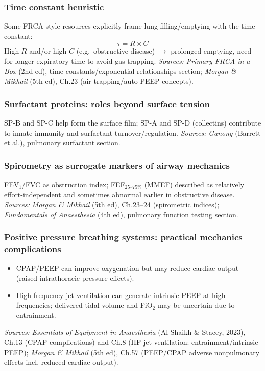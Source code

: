 \documentclass[11pt,a4paper]{article}
\begin{document}
\subsubsection{Time constant heuristic}
Some FRCA-style resources explicitly frame lung filling/emptying with the time constant:
\[
\tau = R \times C
\]
High $R$ and/or high $C$ (e.g.\ obstructive disease) $\rightarrow$ prolonged emptying, need for longer expiratory time to avoid gas trapping.
\textit{Sources:} \emph{Primary FRCA in a Box} (2nd ed), time constants/exponential relationships section; \emph{Morgan \& Mikhail} (5th ed), Ch.23 (air trapping/auto-PEEP concepts).

\subsubsection{Surfactant proteins: roles beyond surface tension}
SP-B and SP-C help form the surface film; SP-A and SP-D (collectins) contribute to innate immunity and surfactant turnover/regulation.
\textit{Sources:} \emph{Ganong} (Barrett et al.), pulmonary surfactant section.

\subsubsection{Spirometry as surrogate markers of airway mechanics}
FEV$_1$/FVC as obstruction index; FEF$_{25\text{--}75\%}$ (MMEF) described as relatively effort-independent and sometimes abnormal earlier in obstructive disease.
\textit{Sources:} \emph{Morgan \& Mikhail} (5th ed), Ch.23--24 (spirometric indices); \emph{Fundamentals of Anaesthesia} (4th ed), pulmonary function testing section.

\subsubsection{Positive pressure breathing systems: practical mechanics complications}
\begin{itemize}
  \item CPAP/PEEP can improve oxygenation but may reduce cardiac output (raised intrathoracic pressure effects).
  \item High-frequency jet ventilation can generate intrinsic PEEP at high frequencies; delivered tidal volume and FiO$_2$ may be uncertain due to entrainment.
\end{itemize}
\textit{Sources:} \emph{Essentials of Equipment in Anaesthesia} (Al-Shaikh \& Stacey, 2023), Ch.13 (CPAP complications) and Ch.8 (HF jet ventilation: entrainment/intrinsic PEEP); \emph{Morgan \& Mikhail} (5th ed), Ch.57 (PEEP/CPAP adverse nonpulmonary effects incl. reduced cardiac output).
\end{document}
